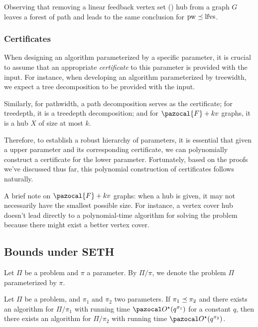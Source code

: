 \medskip

Observing that removing a linear feedback vertex set (\lfvs) hub from a graph $G$ leaves a forest of path and leads to the same conclusion for $\text{pw} \preceq \text{lfvs}$.

\subsubsection*{Certificates}

When designing an algorithm parameterized by a specific parameter, it is crucial to assume that an appropriate \textit{certificate} to this parameter is provided with the input. For instance, when developing an algorithm parameterized by treewidth, we expect a tree decomposition to be provided with the input.

Similarly, for pathwidth, a path decomposition serves as the certificate; for treedepth, it is a treedepth decomposition; and for $\pazocal{F} + kv$ graphs, it is a hub $X$ of size at most $k$.

Therefore, to establish a robust hierarchy of parameters, it is essential that given a upper parameter and its corresponding certificate, we can polynomially construct a certificate for the lower parameter. Fortunately, based on the proofs we've discussed thus far, this polynomial construction of certificates follows naturally.

\medskip

A brief note on $\pazocal{F} + kv$ graphs: when a hub is given, it may not necessarily have the smallest possible size. For instance, a vertex cover hub doesn't lead directly to a polynomial-time algorithm for solving the  problem because there might exist a better vertex cover.

\subsection{Bounds under SETH}

Let $\Pi$ be a problem and $\pi$ a parameter. By $\Pi/\pi$, we denote the problem $\Pi$ parameterized by $\pi$.

\begin{observation}
    \label{obs:upper_bound}
    Let $\Pi$ be a problem, and $\pi_1$ and $\pi_2$ two parameters. If $\pi_1 \preceq \pi_2$ and there exists an algorithm for $\Pi/\pi_1$ with running time $\O^\star(q^{\pi_1})$ for a constant $q$, then there exists an algorithm for $\Pi/\pi_2$ with running time $\O^\star(q^{\pi_2})$.
\end{observation}

